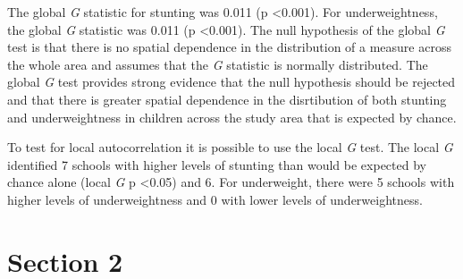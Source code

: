 \documentclass[11pt,a4paper,twoside]{article}\usepackage[]{graphicx}\usepackage[]{color}
\begin{document}
The global \textit{G} statistic for stunting was 0.011 (p \textless 0.001).
For underweightness, the global \textit{G} statistic was 0.011 (p \textless 0.001).
The null hypothesis of the global \textit{G} test is that there is no spatial dependence in the distribution of a measure across the whole area and assumes that the \textit{G} statistic is normally distributed. 
The global \textit{G} test provides strong evidence that the null hypothesis should be rejected and that there is greater spatial dependence in the disrtibution of both stunting and underweightness in children across the study area that is expected by chance. 



To test for local autocorrelation it is possible to use the local \textit{G} test. 
The local \textit{G} identified 7 schools with higher levels of stunting than would be expected by chance alone (local \textit{G} p \textless 0.05) and 6. 
For underweight, there were 5 schools with higher levels of underweightness and 0 with lower levels of underweightness. 

\section*{Section 2}
\end{document}
